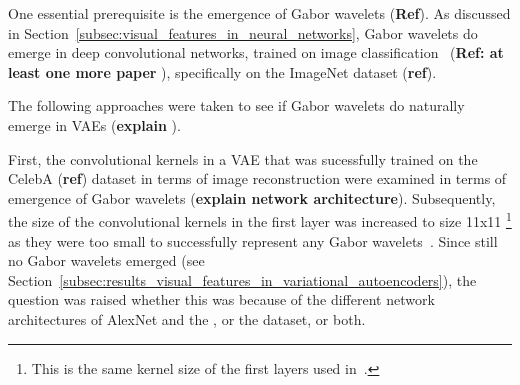 One essential prerequisite is the emergence of Gabor wavelets (\textbf{Ref}).
As discussed in Section~\ref{subsec:visual_features_in_neural_networks}, Gabor wavelets do emerge in deep convolutional networks, trained on image classification~\citep{krizhevsky2012imagenet} (\textbf{Ref: at least one more paper }), specifically on the ImageNet dataset (\textbf{ref}).\par
The following approaches were taken to see if Gabor wavelets do naturally emerge in \acp{VAE} (\textbf{explain }).\par
First, the convolutional kernels in a \ac{VAE} that was sucessfully trained on the CelebA (\textbf{ref}) dataset in terms of image reconstruction were examined in terms of emergence of Gabor wavelets (\textbf{explain network architecture}).
Subsequently, the size of the convolutional kernels in the first layer was increased to size 11x11 \footnote{This is the same kernel size of the first layers used in~\citet{krizhevsky2012imagenet}.} as they were too small to successfully represent any Gabor wavelets~\citep{han2019variational}.
Since still no Gabor wavelets emerged (see Section~\ref{subsec:results_visual_features_in_variational_autoencoders}), the question was raised whether this was because of the different network architectures of AlexNet and the , or the dataset, or both.


